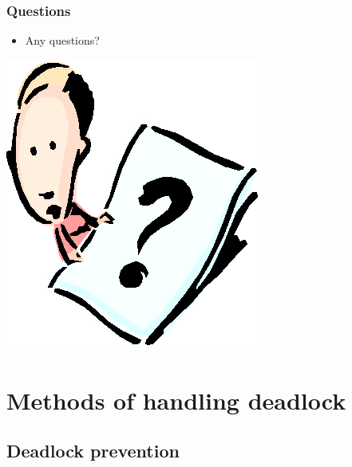 \documentclass[CJKutf8,xcolor=pdftex,dvipsnames,table]{beamer}
\begin{document}
\begin{CJK*}{UTF8}{song}
  \begin{frame}
  \frametitle{Questions}
    \begin{itemize}
	  \item{Any questions?}
    \end{itemize}
    \begin{center}
	  \includegraphics[scale=.5]{question}
    \end{center}
  \end{frame}

\section{Methods of handling deadlock}

\subsection{Deadlock prevention}


\end{CJK*}
\end{document}

